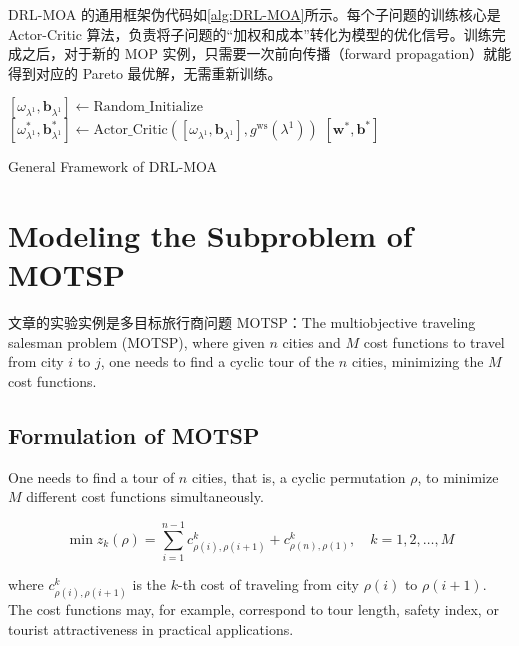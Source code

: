 \documentclass[fontset=none]{ctexart}
\begin{document}
DRL-MOA 的通用框架伪代码如\cref{alg:DRL-MOA}所示。每个子问题的训练核心是 Actor-Critic 算法，负责将子问题的“加权和成本”转化为模型的优化信号。训练完成之后，对于新的 MOP 实例，只需要一次前向传播（forward propagation）就能得到对应的 Pareto 最优解，无需重新训练。

\begin{algorithm}[H]
    \SetAlgoLined
    \SetNoFillComment
    \vspace{3mm}
    $[\omega_{\lambda^1}, \mathbf{b}_{\lambda^1}] \leftarrow \text{Random\_Initialize}$\;
     {
         {
            $[\omega_{\lambda^1}^*, \mathbf{b}_{\lambda^1}^*] \leftarrow \text{Actor\_Critic}([\omega_{\lambda^1}, \mathbf{b}_{\lambda^1}], g^{\text{ws}}(\lambda^1))$\;
        }
    }
    \Return $[\mathbf{w}^*, \mathbf{b}^*]$\;
    \caption{General Framework of DRL-MOA}
    \label{alg:DRL-MOA}
\end{algorithm}

\section{Modeling the Subproblem of MOTSP}

文章的实验实例是多目标旅行商问题 MOTSP：The multiobjective traveling salesman problem (MOTSP), where given $n$ cities and $M$ cost functions to travel from city $i$ to $j$, one needs to find a cyclic tour of the $n$ cities, minimizing the $M$ cost functions. 

\subsection{Formulation of MOTSP}

One needs to find a tour of $n$ cities, that is, a cyclic permutation $\rho$, to minimize $M$ different cost functions simultaneously. 

\begin{equation}
    \min z_k(\rho) = \sum_{i=1}^{n - 1} c^k_{\rho(i), \rho(i + 1)} + c^k_{\rho(n), \rho(1)}, \quad k = 1, 2, \ldots, M
\end{equation}

where $c^k_{\rho(i),\rho(i + 1)}$ is the $k$-th cost of traveling from city $\rho(i)$ to $\rho(i + 1)$. The cost functions may, for example, correspond to tour length, safety index, or tourist attractiveness in practical applications.


\end{document}
